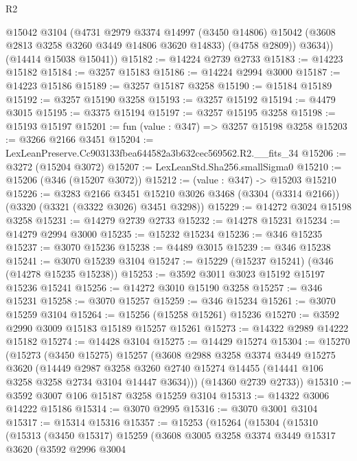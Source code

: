 \begin{lexlean}{R2}
\begin{coremodule}
          @15042
          @3104
          (@4731
            @2979
            @3374
            @14997
            (@3450 @14806)
            @15042
            (@3608 @2813 @3258 @3260 @3449 @14806 @3620 @14833)
            (@4758 @2809))
          @3634))
      (@14414 @15038 @15041))
@15182 := @14224 @2739 @2733
@15183 := @14223 @15182
@15184 := @3257 @15183
@15186 := @14224 @2994 @3000
@15187 := @14223 @15186
@15189 := @3257 @15187 @3258
@15190 := @15184 @15189
@15192 := @3257 @15190 @3258
@15193 := @3257 @15192
@15194 := @4479 @3015
@15195 := @3375 @15194
@15197 := @3257 @15195 @3258
@15198 := @15193 @15197
@15201 := fun (value : @347) => @3257 @15198 @3258
@15203 := @3266 @2166 @3451
@15204 := LexLeanPreserve.Cc903133fbea644582a3b632cec569562.R2.__fits_34
@15206 := @3272 (@15204 @3072)
@15207 := LexLeanStd.Sha256.smallSigma0
@15210 := @15206 (@346 (@15207 @3072))
@15212 := (value : @347) -> @15203 @15210
@15226 := @3283
    @2166
    @3451
    @15210
    @3026
    @3468
    (@3304 (@3314 @2166))
    (@3320 (@3321 (@3322 @3026) @3451 @3298))
@15229 := @14272 @3024 @15198 @3258
@15231 := @14279 @2739 @2733
@15232 := @14278 @15231
@15234 := @14279 @2994 @3000
@15235 := @15232 @15234
@15236 := @346 @15235
@15237 := @3070 @15236
@15238 := @4489 @3015
@15239 := @346 @15238
@15241 := @3070 @15239 @3104
@15247 := @15229 (@15237 @15241) (@346 (@14278 @15235 @15238))
@15253 := @3592 @3011 @3023 @15192 @15197 @15236 @15241
@15256 := @14272 @3010 @15190 @3258
@15257 := @346 @15231
@15258 := @3070 @15257
@15259 := @346 @15234
@15261 := @3070 @15259 @3104
@15264 := @15256 (@15258 @15261) @15236
@15270 := @3592 @2990 @3009 @15183 @15189 @15257 @15261
@15273 := @14322 @2989 @14222 @15182
@15274 := @14428 @3104
@15275 := @14429 @15274
@15304 := @15270
    (@15273
      (@3450 @15275)
      @15257
      (@3608
        @2988
        @3258
        @3374
        @3449
        @15275
        @3620
        (@14449
          @2987
          @3258
          @3260
          @2740
          @15274
          @14455
          (@14441 @106 @3258 @3258 @2734 @3104 @14447 @3634)))
      (@14360 @2739 @2733))
@15310 := @3592 @3007 @106 @15187 @3258 @15259 @3104
@15313 := @14322 @3006 @14222 @15186
@15314 := @3070 @2995
@15316 := @3070 @3001 @3104
@15317 := @15314 @15316
@15357 := @15253
    (@15264
      (@15304
        (@15310
          (@15313
            (@3450 @15317)
            @15259
            (@3608
              @3005
              @3258
              @3374
              @3449
              @15317
              @3620
              (@3592
                @2996
                @3004

\end{coremodule}
\end{lexlean}
